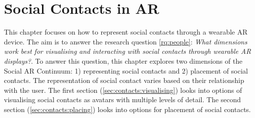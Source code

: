 \chapter{Social Contacts in AR}
\label{ch:contacts} 

This chapter focuses on how to represent social contacts through a wearable AR device. The aim is to answer the research question \ref{rq:people}: \textit{What dimensions work best for visualising and interacting with social contacts through wearable AR displays?}. To answer this question, this chapter explores two dimensions of the Social AR Continuum: 1) representing social contacts and 2) placement of social contacts. The representation of social contact varies based on their relationship with the user. 
The first section (\ref{sec:contacts:visualising}) looks into options of visualising social contacts as avatars with multiple levels of detail. The second section (\ref{sec:contacts:placing}) looks into options for placement of social contacts. 





